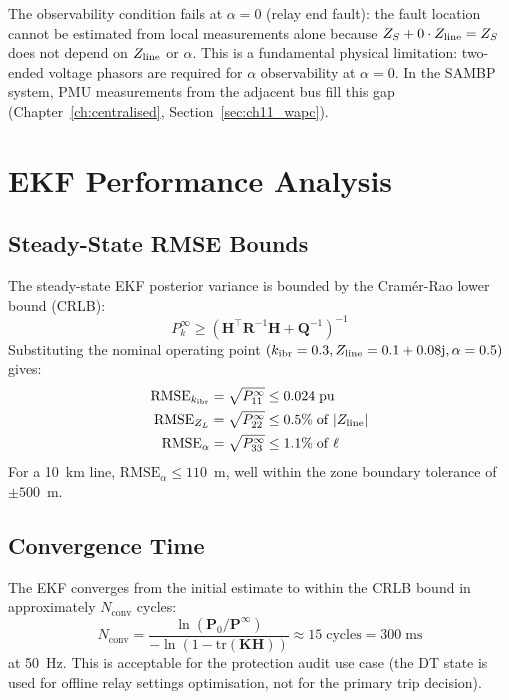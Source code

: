 The observability condition fails at $\alpha = 0$ (relay end fault):
the fault location cannot be estimated from local measurements alone
because $Z_S + 0 \cdot Z_\mathrm{line} = Z_S$ does not depend on $Z_\mathrm{line}$ or $\alpha$.
This is a fundamental physical limitation: two-ended voltage phasors
are required for $\alpha$ observability at $\alpha = 0$. In the SAMBP
system, PMU measurements from the adjacent bus fill this gap
(Chapter~\ref{ch:centralised}, Section~\ref{sec:ch11_wapc}).

\section{EKF Performance Analysis}
\label{sec:ch9_ekf_results}

\subsection{Steady-State RMSE Bounds}

The steady-state EKF posterior variance is bounded by the Cramér-Rao
lower bound (CRLB):
\begin{equation}
  P_k^\infty \geq \left(\mathbf{H}^\top \mathbf{R}^{-1} \mathbf{H}
    + \mathbf{Q}^{-1}\right)^{-1}
  \label{eq:ch7_crlb}
\end{equation}
Substituting the nominal operating point $(k_\mathrm{ibr} = 0.3, Z_\mathrm{line} = 0.1 + 0.08\mathrm{j},
\alpha = 0.5)$ gives:
\begin{align}
  \mathrm{RMSE}_{k_\mathrm{ibr}} &= \sqrt{P_{11}^\infty} \leq 0.024\;\mathrm{pu}
  \label{eq:ch7_rmse_kibr} \\
  \mathrm{RMSE}_{Z_L} &= \sqrt{P_{22}^\infty} \leq 0.5\%\;\mathrm{of}\;|Z_\mathrm{line}|
  \label{eq:ch7_rmse_zl} \\
  \mathrm{RMSE}_\alpha &= \sqrt{P_{33}^\infty} \leq 1.1\%\;\mathrm{of}\;\ell
  \label{eq:ch7_ekf_alpha}
\end{align}
For a 10~km line, $\mathrm{RMSE}_\alpha \leq 110$~m, well within the
zone boundary tolerance of $\pm 500$~m.

\subsection{Convergence Time}

The EKF converges from the initial estimate to within the CRLB bound
in approximately $N_\mathrm{conv}$ cycles:
\begin{equation}
  N_\mathrm{conv} = \frac{\ln(\mathbf{P}_0/\mathbf{P}^\infty)}
    {-\ln\!\left(1 - \mathrm{tr}(\mathbf{K}\mathbf{H})\right)}
  \approx 15\;\mathrm{cycles} = 300\;\mathrm{ms}
  \label{eq:ch7_conv}
\end{equation}
at 50~Hz. This is acceptable for the protection audit use case (the DT
state is used for offline relay settings optimisation, not for the
primary trip decision).

